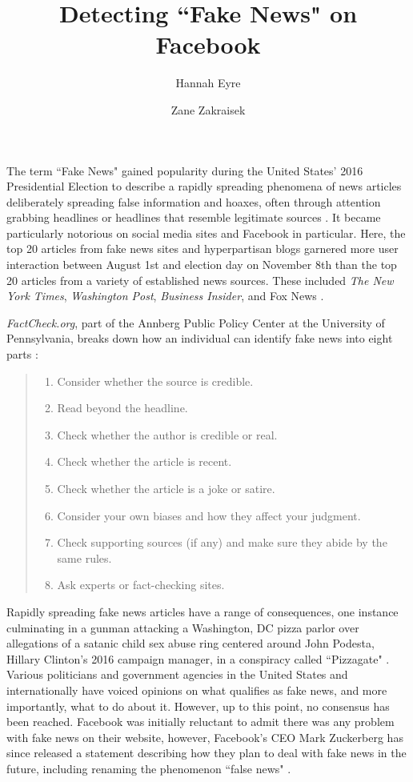 \documentclass[12pt]{article}
\title{Detecting ``Fake News" on Facebook}
\author{Hannah Eyre \and Zane Zakraisek}
\begin{document}
\maketitle
{}

The term ``Fake News" gained popularity during the United States' 2016 Presidential Election to describe a rapidly spreading phenomena of news articles deliberately spreading false information and hoaxes, often through attention grabbing headlines or headlines that resemble legitimate sources \citep{guardian}. It became particularly notorious on social media sites and Facebook in particular. Here, the top 20 articles from fake news sites and hyperpartisan blogs garnered more user interaction between August 1st and election day on November 8th than the top 20 articles from a variety of established news sources. These included {\it The New York Times}, {\it Washington Post}, {\it Business Insider}, and Fox News \citep{buzzfeed}.

\textit{FactCheck.org}, part of the Annberg Public Policy Center at the University of Pennsylvania, breaks down how an individual can identify fake news into eight parts \citep{factcheck}:
\begin{quote}
\begin{enumerate}
\item Consider whether the source is credible.
\item Read beyond the headline.
\item Check whether the author is credible or real.
\item Check whether the article is recent.
\item Check whether the article is a joke or satire.
\item Consider your own biases and how they affect your judgment.
\item Check supporting sources (if any) and make sure they abide by the same rules.
\item Ask experts or fact-checking sites.
\end{enumerate}
\end{quote}

Rapidly spreading fake news articles have a range of consequences, one instance culminating in a gunman attacking a Washington, DC pizza parlor over allegations of a satanic child sex abuse ring centered around John Podesta, Hillary Clinton's 2016 campaign manager, in a conspiracy called ``Pizzagate" \citep{pizzagate}. Various politicians and government agencies in the United States and internationally have voiced opinions on what qualifies as fake news, and more importantly, what to do about it. However, up to this point, no consensus has been reached. Facebook was initially reluctant to admit there was any problem with fake news on their website, however, Facebook's CEO Mark Zuckerberg has since released a statement describing how they plan to deal with fake news in the future, including renaming the phenomenon ``false news" \citep{zuckerberg}.
\end{document}
